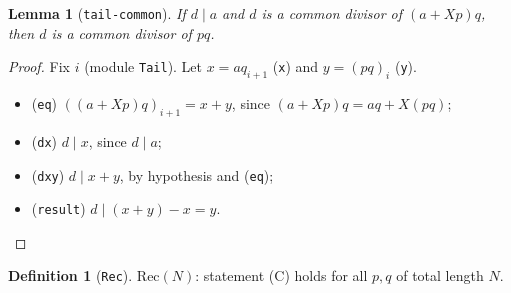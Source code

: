 \documentclass[11pt]{amsart}
\newtheorem{lemma}[theorem]{Lemma}
\theoremstyle{definition}
\newtheorem{definition}[theorem]{Definition}
\theoremstyle{remark}
\newcommand{\nm}[1]{\textup{\texttt{#1}}}
\begin{document}
\begin{lemma}[\nm{tail-common}]\label{lem:tail}
If $d\mid a$ and $d$ is a common divisor of $(a+Xp)q$, then $d$ is a
common divisor of $pq$.
\end{lemma}
\begin{proof}
Fix $i$ (module \nm{Tail}). Let $x = aq_{i+1}$ (\nm{x}) and
$y = (pq)_i$ (\nm{y}).
\begin{itemize}
\item (\nm{eq}) $((a+Xp)q)_{i+1} = x + y$, since $(a+Xp)q = aq + X(pq)$;
\item (\nm{dx}) $d\mid x$, since $d\mid a$;
\item (\nm{dxy}) $d\mid x+y$, by hypothesis and (\nm{eq});
\item (\nm{result}) $d\mid (x+y) - x = y$.\qedhere
\end{itemize}
\end{proof}

\begin{definition}[\nm{Rec}]
$\mathrm{Rec}(N)$: statement (C) holds for all $p,q$ of total length $N$.
\end{definition}
\end{document}
